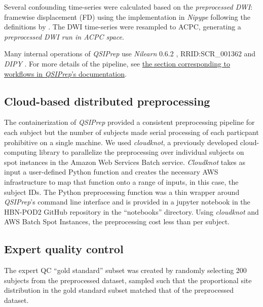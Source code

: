 \documentclass[fleqn,10pt]{wlscirep}
\begin{document}
\begin{itemize}
Several confounding time-series were calculated based on the
\emph{preprocessed DWI}: framewise displacement (FD) using the implementation
in \emph{Nipype} following the definitions by \cite{power-fd-dvars}. The DWI
time-series were resampled to ACPC, generating a \emph{preprocessed DWI run
in ACPC space}.

\end{itemize}

Many internal operations of \emph{QSIPrep} use \emph{Nilearn} 0.6.2
\cite{nilearn}, RRID:SCR\_001362 and \emph{DIPY} \cite{dipy}. For more details
of the pipeline, see
\href{https://qsiprep.readthedocs.io/en/latest/workflows.html}{the section
corresponding to workflows in \emph{QSIPrep}'s documentation}.

\subsection*{Cloud-based distributed preprocessing}

The containerization of \emph{QSIPrep} provided a consistent preprocessing
pipeline for each subject but the number of subjects made serial processing of
each particpant prohibitive on a single machine. We used \emph{cloudknot}, a
previously developed cloud-computing library \cite{cloudknot} to
parallelize the preprocessing over individual subjects on spot instances in the
Amazon Web Services Batch service. \emph{Cloudknot} takes as input a
user-defined Python function and creates the necessary AWS infrastructure to map
that function onto a range of inputs, in this case, the subject IDs. The Python
preprocessing function was a thin wrapper around \emph{QSIPrep}'s command line
interface and is provided in a jupyter notebook in the HBN-POD2 GitHub
repository in the ``notebooks'' directory. Using \emph{cloudknot} and AWS Batch
Spot Instances, the preprocessing cost less than  per subject.

\subsection*{Expert quality control}

The expert QC ``gold standard'' subset was created by randomly selecting 200
subjects from the preprocessed dataset, sampled such that the proportional site
distribution in the gold standard subset matched that of the preprocessed
dataset.
\end{document}
